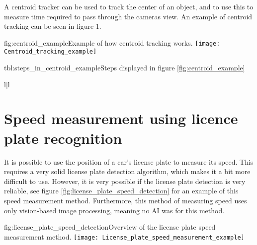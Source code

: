 A centroid tracker can be used to track the center of an object, and to use this to measure time required to pass through the cameras view. An example 
of centroid tracking can be seen in figure 1.

\begin{linfigure}{fig:centroid_example}{Example of how centroid tracking works.}
    \texttt{[image: Centroid\_tracking\_example]}
\end{linfigure}

\begin{lintable}{tbl:steps_in_centroid_example}{Steps displayed in figure \ref{fig:centroid_example}}
    \begin{lintabular}{l|l}
    \end{lintabular}
\end{lintable}

\section{Speed measurement using licence plate recognition}
It is possible to use the position of a car's license plate to measure its speed. This requires a very solid license plate detection 
algorithm, which makes it a bit more difficult to use. However, it is very possible if the license plate detection is very reliable, see
figure \ref{fig:license_plate_speed_detection} for an example of this speed measurement method. Furthermore, this method of measuring speed
uses only vision-based image processing, meaning no AI was for this method.

\begin{linfigure}{fig:license_plate_speed_detection}{Overview of the license plate speed measurement method.}
    \texttt{[image: License\_plate\_speed\_measurement\_example]}
\end{linfigure}


